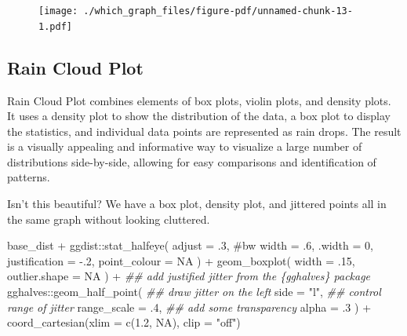 \documentclass[
  letterpaper,
]{book}
\newenvironment{Shaded}{\begin{snugshade}}{\end{snugshade}}
\newcommand{\AttributeTok}[1]{\textcolor[rgb]{0.40,0.45,0.13}{#1}}
\newcommand{\CommentTok}[1]{\textcolor[rgb]{0.37,0.37,0.37}{#1}}
\newcommand{\ConstantTok}[1]{\textcolor[rgb]{0.56,0.35,0.01}{#1}}
\newcommand{\DecValTok}[1]{\textcolor[rgb]{0.68,0.00,0.00}{#1}}
\newcommand{\DocumentationTok}[1]{\textcolor[rgb]{0.37,0.37,0.37}{\textit{#1}}}
\newcommand{\FloatTok}[1]{\textcolor[rgb]{0.68,0.00,0.00}{#1}}
\newcommand{\FunctionTok}[1]{\textcolor[rgb]{0.28,0.35,0.67}{#1}}
\newcommand{\NormalTok}[1]{\textcolor[rgb]{0.00,0.23,0.31}{#1}}
\newcommand{\SpecialCharTok}[1]{\textcolor[rgb]{0.37,0.37,0.37}{#1}}
\newcommand{\StringTok}[1]{\textcolor[rgb]{0.13,0.47,0.30}{#1}}
\begin{document}
\begin{figure}[H]

{\centering \texttt{[image: ./which\_graph\_files/figure-pdf/unnamed-chunk-13-1.pdf]}

}

\end{figure}

\hypertarget{rain-cloud-plot}{%
\subsection{Rain Cloud Plot}\label{rain-cloud-plot}}

Rain Cloud Plot combines elements of box plots, violin plots, and
density plots. It uses a density plot to show the distribution of the
data, a box plot to display the statistics, and individual data points
are represented as rain drops. The result is a visually appealing and
informative way to visualize a large number of distributions
side-by-side, allowing for easy comparisons and identification of
patterns.

Isn't this beautiful? We have a box plot, density plot, and jittered
points all in the same graph without looking cluttered.

\begin{Shaded}
\begin{Highlighting}[]
\NormalTok{base\_dist }\SpecialCharTok{+}
\NormalTok{  ggdist}\SpecialCharTok{::}\FunctionTok{stat\_halfeye}\NormalTok{(}
    \AttributeTok{adjust =}\NormalTok{ .}\DecValTok{3}\NormalTok{, }\CommentTok{\#bw}
    \AttributeTok{width =}\NormalTok{ .}\DecValTok{6}\NormalTok{, }
    \AttributeTok{.width =} \DecValTok{0}\NormalTok{, }
    \AttributeTok{justification =} \SpecialCharTok{{-}}\NormalTok{.}\DecValTok{2}\NormalTok{, }
    \AttributeTok{point\_colour =} \ConstantTok{NA}
\NormalTok{  ) }\SpecialCharTok{+} 
  \FunctionTok{geom\_boxplot}\NormalTok{(}
    \AttributeTok{width =}\NormalTok{ .}\DecValTok{15}\NormalTok{, }
    \AttributeTok{outlier.shape =} \ConstantTok{NA}
\NormalTok{  ) }\SpecialCharTok{+}
  \DocumentationTok{\#\# add justified jitter from the \{gghalves\} package}
\NormalTok{  gghalves}\SpecialCharTok{::}\FunctionTok{geom\_half\_point}\NormalTok{(}
    \DocumentationTok{\#\# draw jitter on the left}
    \AttributeTok{side =} \StringTok{"l"}\NormalTok{, }
    \DocumentationTok{\#\# control range of jitter}
    \AttributeTok{range\_scale =}\NormalTok{ .}\DecValTok{4}\NormalTok{, }
    \DocumentationTok{\#\# add some transparency}
    \AttributeTok{alpha =}\NormalTok{ .}\DecValTok{3}
\NormalTok{  ) }\SpecialCharTok{+}
  \FunctionTok{coord\_cartesian}\NormalTok{(}\AttributeTok{xlim =} \FunctionTok{c}\NormalTok{(}\FloatTok{1.2}\NormalTok{, }\ConstantTok{NA}\NormalTok{), }\AttributeTok{clip =} \StringTok{"off"}\NormalTok{) }
\end{Highlighting}
\end{Shaded}
\end{document}
